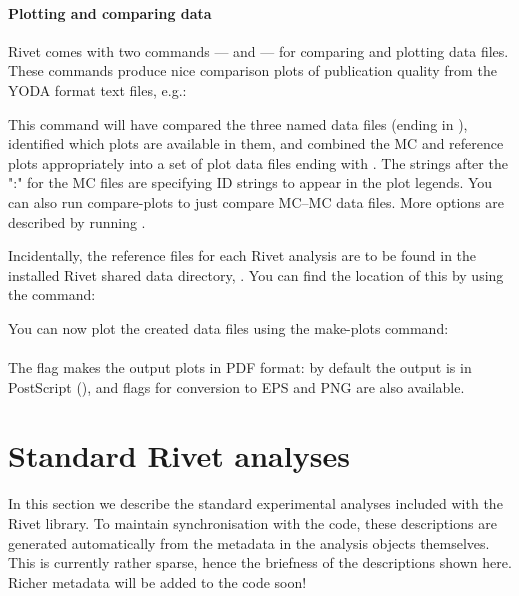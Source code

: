 \documentclass{JHEP3}
\begin{document}
\subsection{Plotting and comparing data}

Rivet comes with two commands ---  and  ---
for comparing and plotting data files. These commands produce nice comparison
plots of publication quality from the YODA format text files, e.g.:\\

This command will have compared the three named data files (ending in
), identified which plots are available in them, and combined the MC
and reference plots appropriately into a set of plot data files ending with
. The strings after the ":" for the MC files are specifying ID strings to
appear in the plot legends. You can also run compare-plots to just compare MC--MC
data files. More options are described by running .

Incidentally, the reference files for each Rivet analysis are to be found in the
installed Rivet shared data directory, . You
can find the location of this by using the  command:\\

\noindent
You can now plot the created data files using the make-plots command:\\
\\
The  flag makes the output plots in PDF format: by default the output
is in PostScript (), and flags for conversion to EPS and PNG are also
available.



\cleardoublepage
\part{Standard Rivet analyses}
\label{part:analyses}


In this section we describe the standard experimental analyses included with the
Rivet library. To maintain synchronisation with the code, these descriptions are
generated automatically from the metadata in the analysis objects
themselves. This is currently rather sparse, hence the briefness of the
descriptions shown here. Richer metadata will be added to the code soon!
\end{document}
